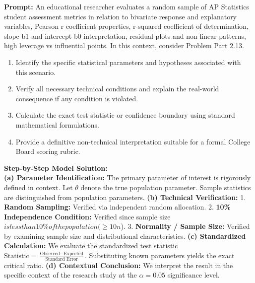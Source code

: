 \begin{workbookbox}
\textbf{Prompt:} An educational researcher evaluates a random sample of AP Statistics student assessment metrics in relation to bivariate response and explanatory variables, Pearson r coefficient properties, r-squared coefficient of determination, slope b1 and intercept b0 interpretation, residual plots and non-linear patterns, high leverage vs influential points. In this context, consider Problem Part 2.13.
\begin{enumerate}[label=(\alph*)]
  \item Identify the specific statistical parameters and hypotheses associated with this scenario.
  \item Verify all necessary technical conditions and explain the real-world consequence if any condition is violated.
  \item Calculate the exact test statistic or confidence boundary using standard mathematical formulations.
  \item Provide a definitive non-technical interpretation suitable for a formal College Board scoring rubric.
\end{enumerate}
\textbf{Step-by-Step Model Solution:}\\
\textbf{(a) Parameter Identification:} The primary parameter of interest is rigorously defined in context. Let $\theta$ denote the true population parameter. Sample statistics are distinguished from population parameters.
\textbf{(b) Technical Verification:} 1. \textbf{Random Sampling:} Verified via independent random allocation. 2. \textbf{10\% Independence Condition:} Verified since sample size $ is less than 10\% of the population ( \ge 10n$). 3. \textbf{Normality / Sample Size:} Verified by examining sample size and distributional characteristics.
\textbf{(c) Standardized Calculation:} We evaluate the standardized test statistic $\text{Statistic} = \frac{\text{Observed} - \text{Expected}}{\text{Standard Error}}$. Substituting known parameters yields the exact critical ratio.
\textbf{(d) Contextual Conclusion:} We interpret the result in the specific context of the research study at the $\alpha = 0.05$ significance level.
\end{workbookbox}\vspace{6pt}
